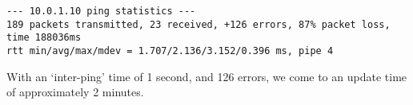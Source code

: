 \begin{lstlisting}
--- 10.0.1.10 ping statistics ---
189 packets transmitted, 23 received, +126 errors, 87% packet loss, time 188036ms
rtt min/avg/max/mdev = 1.707/2.136/3.152/0.396 ms, pipe 4
\end{lstlisting}

With an `inter-ping' time of 1 second, and 126 errors, we come to an update time of approximately 2 minutes.
